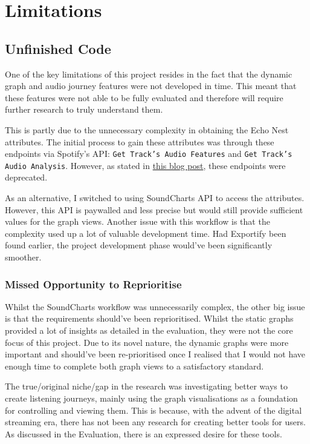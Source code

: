 \section{Limitations}
\subsection{Unfinished Code}
One of the key limitations of this project resides in the fact that the dynamic graph and audio journey features were not developed in time. This meant that these features were not able to be fully evaluated and therefore will require further research to truly understand them.

This is partly due to the unnecessary complexity in obtaining the Echo Nest attributes. The initial process to gain these attributes was through these endpoints via Spotify's API: \texttt{Get Track's Audio Features} and \texttt{Get Track's Audio Analysis}. However, as stated in \href{https://developer.spotify.com/blog/2024-11-27-changes-to-the-web-api}{this blog post}, these endpoints were deprecated.

As an alternative, I switched to using SoundCharts API to access the attributes. However, this API is paywalled and less precise but would still provide sufficient values for the graph views. Another issue with this workflow is that the complexity used up a lot of valuable development time. Had Exportify been found earlier, the project development phase would've been significantly smoother.

\subsubsection{Missed Opportunity to Reprioritise}
Whilst the SoundCharts workflow was unnecessarily complex, the other big issue is that the requirements should've been reprioritised. Whilst the static graphs provided a lot of insights as detailed in the evaluation, they were not the core focus of this project. Due to its novel nature, the dynamic graphs were more important and should've been re-prioritised once I realised that I would not have enough time to complete both graph views to a satisfactory standard.

The true/original niche/gap in the research was investigating better ways to create listening journeys, mainly using the graph visualisations as a foundation for controlling and viewing them. This is because, with the advent of the digital streaming era, there has not been any research for creating better tools for users. As discussed in the Evaluation, there is an expressed desire for these tools.

